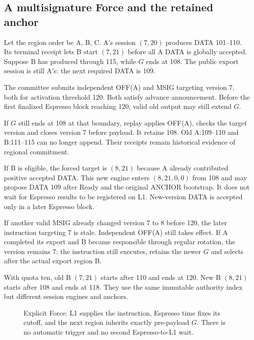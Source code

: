 \subsection{A multisignature Force and the retained anchor}
\label{sec:force-example}
Let the region order be A, B, C. A's session $(7,20)$ produces
DATA 101--110. Its terminal receipt lets B start $(7,21)$ before
all A DATA is globally accepted. Suppose B has produced through 115,
while $G$ ends at 108. The public export session is still A's:
the next required DATA is 109.

The committee submits independent OFF(A) and MSIG targeting version 7,
both for activation threshold 120. Both satisfy advance announcement.
Before the first finalized Espresso block reaching 120, valid old
output may still extend $G$.

If $G$ still ends at 108 at that boundary, replay applies OFF(A),
checks the target version and closes version 7 before payload.
It retains 108. Old A:109--110 and B:111--115 can no longer append.
Their receipts remain historical evidence of regional commitment.

If B is eligible, the forced target is $(8,21)$ because A already
contributed positive accepted DATA. This new engine enters
$(8,21,0,0)$ from 108 and may propose DATA 109 after Ready and the
original ANCHOR bootstrap. It does not wait for Espresso results to
be registered on L1. New-version DATA is accepted only in a later
Espresso block.

If another valid MSIG already changed version 7 to 8 before 120,
the later instruction targeting 7 is stale. Independent OFF(A) still
takes effect. If A completed its export and B became responsible through
regular rotation, the version remains 7: the instruction still executes,
retains the newer $G$ and selects after the actual export region B.

With quota ten, old B $(7,21)$ starts after 110 and ends at 120.
New B $(8,21)$ starts after 108 and ends at 118. They use the same
immutable authority index but different session engines and anchors.

\begin{figure}[p]\centering

\caption{Explicit Force: L1 supplies the instruction, Espresso time
fixes its cutoff, and the next region inherits exactly pre-payload $G$.
There is no automatic trigger and no second Espresso-to-L1 wait.}
\label{fig:forced-cross-region}
\end{figure}
\FloatBarrier

